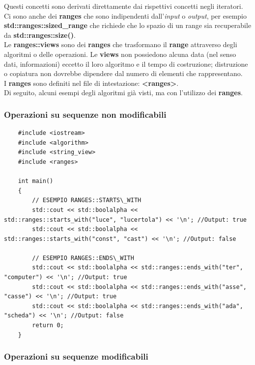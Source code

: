 \textsf{\small Questi concetti sono derivati direttamente dai rispettivi concetti negli iteratori.} \\

\textsf{\small Ci sono anche dei \textbf{ranges} che sono indipendenti dall'\emph{input} o \emph{output}, per esempio \textbf{std::ranges::sized\_range} che richiede che lo spazio di un range sia recuperabile da \textbf{std::ranges::size()}.} \\

\textsf{\small Le \textbf{ranges::views} sono dei \textbf{ranges} che trasformano il \textbf{range} attraverso degli algoritmi o delle operazioni. Le \textbf{views} non possiedono alcuna data (nel senso dati, informazioni) eccetto il loro algoritmo e il tempo di costruzione; distruzione o copiatura non dovrebbe dipendere dal numero di elementi che rappresentano.} \\

\textsf{\small I \textbf{ranges} sono definiti nel file di intestazione: \textbf{<ranges>}.} \\

\textsf{\small Di seguito, alcuni esempi degli algoritmi già visti, ma con l'utilizzo dei \textbf{ranges}. } \\

\subsubsection{Operazioni su sequenze non modificabili}

\label{ranges_seq_non_modificabili}

\begin{lstlisting}
	#include <iostream>
	#include <algorithm>
	#include <string_view>
	#include <ranges>
	
	int main()
	{
		// ESEMPIO RANGES::STARTS\_WITH
		std::cout << std::boolalpha << std::ranges::starts_with("luce", "lucertola") << '\n'; //Output: true
		std::cout << std::boolalpha << std::ranges::starts_with("const", "cast") << '\n'; //Output: false
		
		// ESEMPIO RANGES::ENDS\_WITH
		std::cout << std::boolalpha << std::ranges::ends_with("ter", "computer") << '\n'; //Output: true
		std::cout << std::boolalpha << std::ranges::ends_with("asse", "casse") << '\n'; //Output: true
		std::cout << std::boolalpha << std::ranges::ends_with("ada", "scheda") << '\n'; //Output: false
		return 0;
	}
\end{lstlisting}

\subsubsection{Operazioni su sequenze modificabili}

